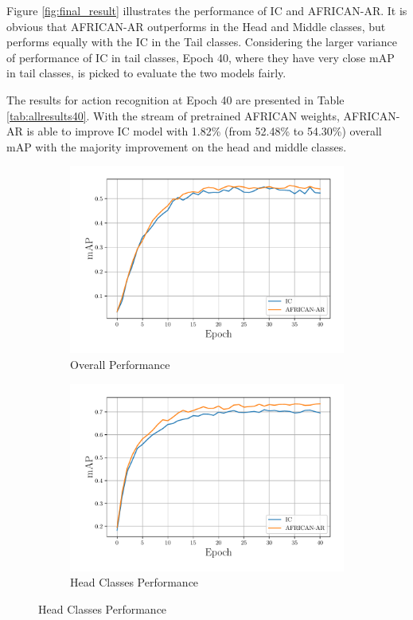 Figure \ref{fig:final_result} illustrates the performance of IC and AFRICAN-AR. It is obvious that AFRICAN-AR outperforms in the Head and Middle classes, but performs equally with the IC in the Tail classes. Considering the larger variance of performance of IC in tail classes, Epoch 40, where they have very close mAP in tail classes, is picked to evaluate the two models fairly. 

The results for action recognition at Epoch 40 are presented in Table \ref{tab:allresults40}. With the stream of pretrained AFRICAN weights, AFRICAN-AR is able to improve IC model with 1.82\% (from 52.48\% to 54.30\%) overall mAP with the majority improvement on the head and middle classes.

\begin{figure}
    \centering
    \begin{adjustwidth}{-0.15\linewidth}{-0.07\linewidth}
    \begin{subfigure}[b]{0.65\textwidth}
        \includegraphics[width=\textwidth]{assets/charts/4_4_finalscore_0_overall}
        \caption{Overall Performance}
        \label{fig:subfig1}
    \end{subfigure}
    \begin{subfigure}[b]{0.65\textwidth}
        \includegraphics[width=\textwidth]{assets/charts/4_4_finalscore_1_head}
        \caption{Head Classes Performance}
        \label{fig:subfig2}
    \end{subfigure}


\end{adjustwidth}
\end{figure}
